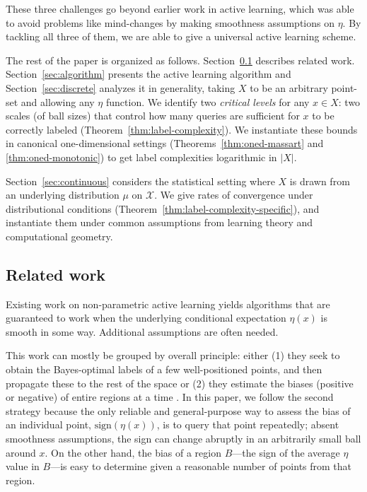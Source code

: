 \documentclass[twoside]{article}
\def\X{{\mathcal X}}
\begin{document}
These three challenges go beyond earlier work in active learning, which was able to avoid problems like mind-changes by making smoothness assumptions on $\eta$. By tackling all three of them, we are able to give a
universal active learning scheme. 

The rest of the paper is organized as follows. Section~\ref{sec:relatedwork} describes related work.
Section~\ref{sec:algorithm} presents the active learning algorithm and Section~\ref{sec:discrete} analyzes it in generality, taking $X$ to be an arbitrary point-set and allowing any $\eta$ function. We identify two \emph{critical levels} for any $x \in X$: two scales (of ball sizes) that control how many queries are sufficient for $x$ to be correctly labeled (Theorem~\ref{thm:label-complexity}). We instantiate these bounds in canonical one-dimensional settings (Theorems~\ref{thm:oned-massart} and \ref{thm:oned-monotonic}) to get label complexities logarithmic in $|X|$.

Section~\ref{sec:continuous} considers the statistical setting where $X$ is drawn from an underlying distribution $\mu$ on $\X$. We give rates of convergence under distributional conditions (Theorem~\ref{thm:label-complexity-specific}), and instantiate them under common assumptions from learning theory and computational geometry.

\subsection{Related work} \label{sec:relatedwork}

Existing work on non-parametric active learning yields algorithms that are guaranteed to work when the underlying conditional expectation $\eta(x)$ is smooth in some way. Additional assumptions are often needed.

This work can mostly be grouped by overall principle: either (1) they
seek to obtain the Bayes-optimal labels of a few well-positioned
points, and then propagate these to the rest of the space
\cite{DNZ15,H17,ASU18} or (2) they estimate the biases (positive or
negative) of entire regions at a time \cite{DH08,M12}. In this paper,
we follow the second strategy because the only reliable and
general-purpose way to assess the bias of an individual point,
$\mbox{sign}(\eta(x))$, is to query that point repeatedly; absent
smoothness assumptions, the sign can change abruptly in an arbitrarily
small ball around $x$. On the other hand, the bias of a region
$B$---the sign of the average $\eta$ value in $B$---is easy to
determine given a reasonable number of points from that region.
\end{document}
